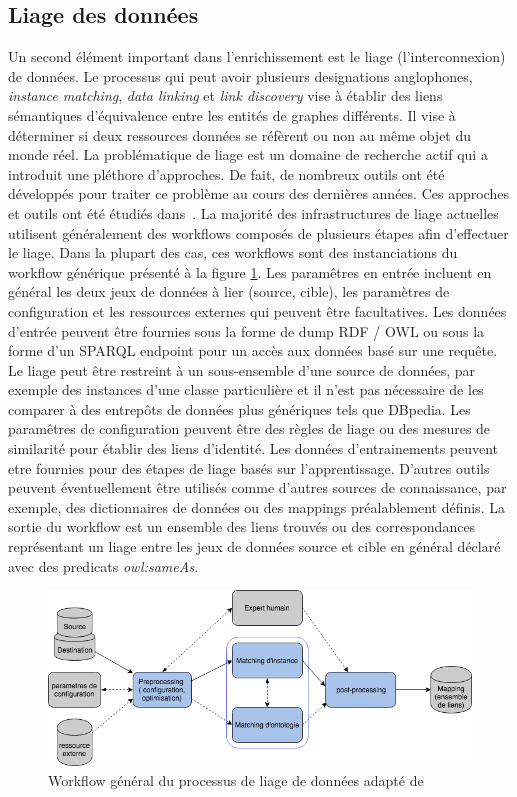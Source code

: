 \subsection{Liage des données}

Un second élément important dans l’enrichissement est le liage (l’interconnexion) de données. Le processus qui peut avoir plusieurs designations anglophones, \textit{instance matching}, \textit{data linking} et \textit{link discovery} vise à établir des liens sémantiques d’équivalence entre les entités de graphes différents. Il vise à déterminer si deux ressources données se réfèrent ou non au même objet du monde réel. La problématique de liage est un domaine de recherche actif qui a introduit une pléthore d'approches. De fait, de nombreux outils ont été développés pour traiter ce problème au cours des dernières années. Ces approches et outils ont été étudiés dans~\cite{ferrara2011,Achichi2016,erv271}. 
La majorité des infrastructures de liage actuelles utilisent généralement des workflows composés de plusieurs étapes afin d'effectuer le liage. Dans la plupart des cas, ces workflows sont des instanciations du workflow générique présenté à la figure \ref{liage1}. Les paramêtres en entrée incluent en général les deux jeux de données à lier (source, cible), les paramètres de configuration et les ressources externes qui peuvent être facultatives. Les données d'entrée peuvent être fournies sous la forme de dump RDF / OWL ou sous la forme d'un SPARQL endpoint pour un accès aux données basé sur une requête. Le liage peut être restreint à un sous-ensemble d'une source de données, par exemple des instances d'une classe particulière et il n'est pas nécessaire de les comparer à des entrepôts de données plus génériques tels que DBpedia. Les paramêtres de configuration peuvent être des règles de liage ou des mesures de similarité pour établir des liens d'identité. Les données d'entrainements peuvent etre fournies pour des étapes de liage basés sur l'apprentissage. D'autres outils peuvent éventuellement être utilisés comme d'autres sources de connaissance, par exemple, des dictionnaires de données ou des mappings préalablement définis. La sortie du workflow est un ensemble des liens trouvés ou des correspondances représentant un liage entre les jeux de données source et cible en général déclaré avec des predicats \textit{owl:sameAs}.


\begin{figure}[!ht]
\begin{center}
	\includegraphics[width=1\textwidth]{Figures/liage.png}
\end{center}
\caption{\label{liage1} Workflow général du processus de liage de données adapté de~\cite{erv271} }
\end{figure}

